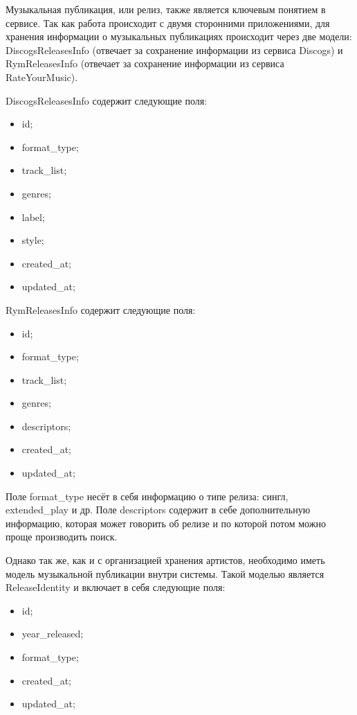 Музыкальная публикация, или релиз, также является ключевым понятием в сервисе. Так как работа происходит с двумя сторонними приложениями, для хранения информации о музыкальных публикациях происходит через две модели: DiscogsReleasesInfo (отвечает за сохранение информации из сервиса Discogs) и RymReleasesInfo (отвечает за сохранение информации из сервиса RateYourMusic).

DiscogsReleasesInfo содержит следующие поля:

\begin{itemize}
  \item id;
  \item format\_type;
  \item track\_list;
  \item genres;
  \item label;
  \item style;
  \item created\_at;
  \item updated\_at;
\end{itemize}

RymReleasesInfo содержит следующие поля:

\begin{itemize}
  \item id;
  \item format\_type;
  \item track\_list;
  \item genres;
  \item descriptors;
  \item created\_at;
  \item updated\_at;
\end{itemize}

Поле format\_type несёт в себя информацию о типе релиза: сингл, extended\_play и др. Поле descriptors содержит в себе дополнительную информацию, которая может говорить об релизе и по которой потом можно проще производить поиск.

Однако так же, как и с организацией хранения артистов, необходимо иметь модель музыкальной публикации внутри системы. Такой моделью является ReleaseIdentity и включает в себя следующие поля:

\begin{itemize}
  \item id;
  \item year\_released;
  \item format\_type;
  \item created\_at;
  \item updated\_at;
\end{itemize}

